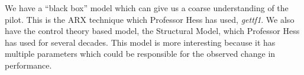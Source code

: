 
We have a ``black box'' model which can give us a coarse understanding of the pilot.
This is the ARX technique which Professor Hess has used, \textit{gettf1}.
We also have the control theory based model, the Structural Model, which Professor Hess has used for several decades.
This model is more interesting because it has multiple parameters which could be responsible for the observed change in performance.


